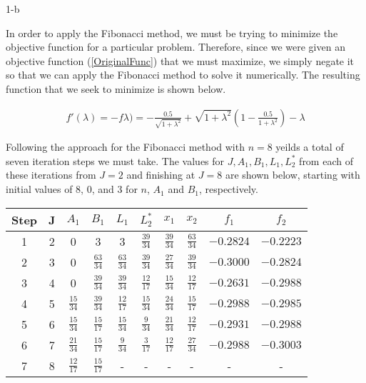 \documentclass[11pt]{article}
\begin{document}
\begin{prob}{1-b}
\end{prob}
\begin{sol} 

In order to apply the Fibonacci method, we must be trying to minimize the objective function for a particular problem. Therefore, since we were given an objective function (\ref{OriginalFunc}) that we must maximize, we simply negate it so that we can apply the Fibonacci method to solve it numerically. The resulting function that we seek to minimize is shown below.

\begin{eqnarray*}
f'(\lambda) = -f\lambda) =-\frac{0.5}{\sqrt{1+\lambda^2}}+\sqrt{1+\lambda^2} \left(1-\frac{0.5}{1+\lambda^2}\right)-\lambda
\end{eqnarray*}

Following the approach for the Fibonacci method with $n=8$ yeilds a total of seven iteration steps we must take. The values for $J, A_{1}, B_{1}, L_{1}, L_{2}^*$ from each of these iterations from $J=2$ and finishing at $J=8$ are shown below, starting with initial values of $8$, $0$, and $3$ for $n$, $A_{1}$ and $B_{1}$, respectively.

\begin{center}
  \begin{tabular}{| c | c | c | c | c | c | c | c | c | c |}
    \hline
	Step & J & $A_{1}$ & $B_{1}$ & \textbf{$L_{1}$} & \textbf{$L_{2}^{*}$} & $x_1$ & $x_2$ & $f_1$ & $f_2$\\ \hline
	1 & 2 & 0 & 3 & 3 & $\frac{39}{34}$ & $\frac{39}{34}$ & $\frac{63}{34}$ & $-0.2824$ & $-0.2223$ \\ \hline
	2 & 3 & 0 & $\frac{63}{34}$ & $\frac{63}{34}$ & $\frac{39}{34}$ & $\frac{27}{34}$ & $\frac{39}{34}$ & $-0.3000$ & $-0.2824$\\ \hline
	3 & 4 & 0 & $\frac{39}{34}$ & $\frac{39}{34}$ & $\frac{12}{17}$ & $\frac{15}{34}$ & $\frac{12}{17}$ & $-0.2631$ & $-0.2988$\\ \hline
	4 & 5 & $\frac{15}{34}$ & $\frac{39}{34}$ & $\frac{12}{17}$ & $\frac{15}{34}$ & $\frac{24}{34}$ & $\frac{15}{17}$ & $-0.2988$ & $-0.2985$\\ \hline
	5 & 6 & $\frac{15}{34}$ & $\frac{15}{17}$ & $\frac{15}{34}$ & $\frac{9}{34}$ & $\frac{21}{34}$ & $\frac{12}{17}$ & $-0.2931$ & $-0.2988$\\ \hline
	6 & 7 & $\frac{21}{34}$ & $\frac{15}{17}$ & $\frac{9}{34}$ & $\frac{3}{17}$ & $\frac{12}{17}$ & $\frac{27}{34}$ & $-0.2988$ & $-0.3003$\\ \hline
	7 & 8 & $\frac{12}{17}$ & $\frac{15}{17}$ & - & - & - & - & - & -\\ \hline
  \end{tabular}
\end{center}


\end{sol}
\end{document}
